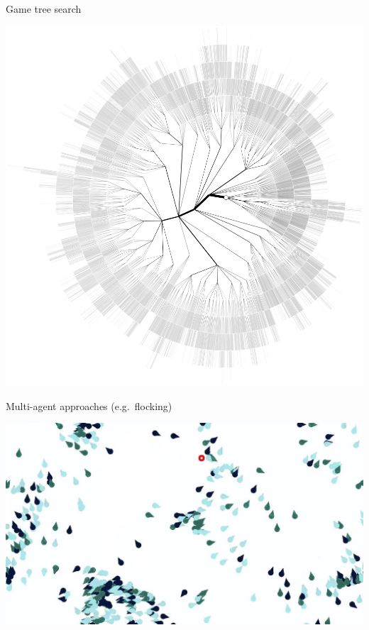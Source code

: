 \begin{frame}{Game tree search}
	\begin{center}
		\includegraphics[height=0.7\textheight]{mcts}
	\end{center}
\end{frame}

\begin{frame}{Multi-agent approaches (e.g.\ flocking)}
	\begin{center}
		\includegraphics[width=\textwidth]{flocking}
	\end{center}
\end{frame}

